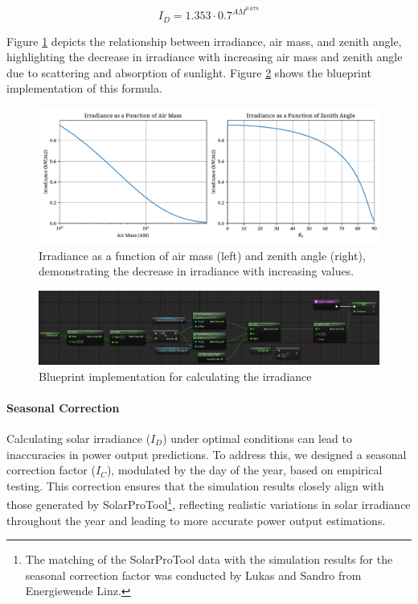 \documentclass[draft, final]{vutinfth} %
\begin{document}
\begin{equation} \label{eq:irradiance}
I_D = 1.353 \cdot 0.7^{AM^{0.678}}
\end{equation}

Figure \ref{fig:irradiance} depicts the relationship between irradiance, air mass, and zenith angle, highlighting the decrease in irradiance with increasing air mass and zenith angle due to scattering and absorption of sunlight. Figure \ref{fig:irradiance-blueprint} shows the blueprint implementation of this formula.

\begin{figure}[h]
    \centering
    \includegraphics[width=\textwidth]{graphics/irradiance.pdf}
    \caption{Irradiance as a function of air mass (left) and zenith angle (right), demonstrating the decrease in irradiance with increasing values.}
    \label{fig:irradiance}
\end{figure}

\begin{figure}
    \centering
    \includegraphics[width=\textwidth]{graphics/irradiance-bp.jpg}
    \caption{Blueprint implementation for calculating the irradiance}
    \label{fig:irradiance-blueprint}
\end{figure}

\paragraph{Seasonal Correction}

Calculating solar irradiance ($I_D$) under optimal conditions can lead to inaccuracies in power output predictions. To address this, we designed a seasonal correction factor ($I_C$), modulated by the day of the year, based on empirical testing. This correction ensures that the simulation results closely align with those generated by SolarProTool\footnote{The matching of the SolarProTool data with the simulation results for the seasonal correction factor was conducted by Lukas and Sandro from Energiewende Linz.}, reflecting realistic variations in solar irradiance throughout the year and leading to more accurate power output estimations.
\end{document}
